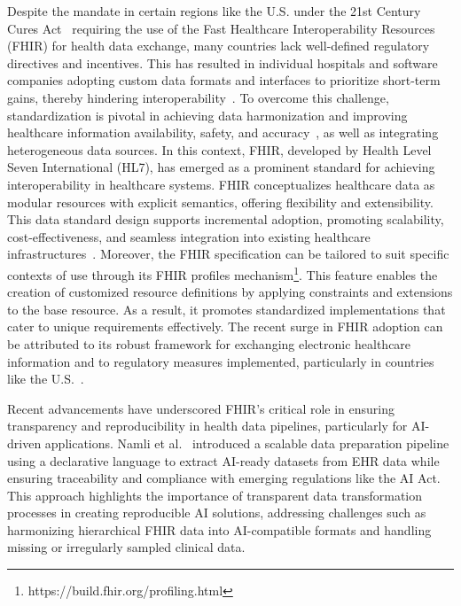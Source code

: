 Despite the mandate in certain regions like the U.S. under the 21st Century Cures Act~\cite{noauthor_21st_2020} requiring the use of the Fast Healthcare Interoperability Resources (FHIR) for health data exchange, many countries lack well-defined regulatory directives and incentives. This has resulted in individual hospitals and software companies adopting custom data formats and interfaces to prioritize short-term gains, thereby hindering interoperability~\cite{benson_why_2021}. To overcome this challenge, standardization is pivotal in achieving data harmonization and improving healthcare information availability, safety, and accuracy~\cite{montazeri2023developing,lehne_why_2019}, as well as integrating heterogeneous data sources. In this context, FHIR, developed by Health Level Seven International (HL7), has emerged as a prominent standard for achieving interoperability in healthcare systems. FHIR conceptualizes healthcare data as modular resources with explicit semantics, offering flexibility and extensibility. This data standard design supports incremental adoption, promoting scalability, cost-effectiveness, and seamless integration into existing healthcare infrastructures~\cite{benson_why_2021}.
Moreover, the FHIR specification can be tailored to suit specific contexts of use through its FHIR profiles mechanism\footnote{https://build.fhir.org/profiling.html}. This feature enables the creation of customized resource definitions by applying constraints and extensions to the base resource. As a result, it promotes standardized implementations that cater to unique requirements effectively.
The recent surge in FHIR adoption can be attributed to its robust framework for exchanging electronic healthcare information and to regulatory measures implemented, particularly in countries like the U.S.~\cite{vorisek_fast_2022}.

Recent advancements have underscored FHIR's critical role in ensuring transparency and reproducibility in health data pipelines, particularly for AI-driven applications. Namli et al.~\cite{namli2024scalable} introduced a scalable data preparation pipeline using a declarative language to extract AI-ready datasets from EHR data while ensuring traceability and compliance with emerging regulations like the AI Act. This approach highlights the importance of transparent data transformation processes in creating reproducible AI solutions, addressing challenges such as harmonizing hierarchical FHIR data into AI-compatible formats and handling missing or irregularly sampled clinical data.

